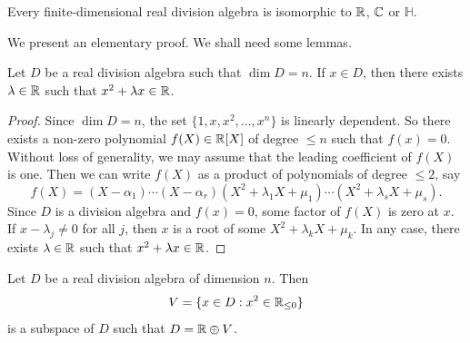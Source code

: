 \begin{theorem}[Frobenius]
	\label{thm:Frobenius}
	Every finite-dimensional real division algebra is isomorphic to $\mathbb{R}$, $\mathbb{C}$
	or $\mathbb{H}$.
\end{theorem}

We present an elementary proof. We shall need some lemmas. 

\begin{lemma}
	\label{lem:trick_frobenius1}
	Let $D$ be a real division algebra such that $\dim D=n$. If $x\in D$, then
	there exists $\lambda\in\mathbb{R}$ such that $x^2+\lambda x\in\mathbb{R}$.
\end{lemma}

\begin{proof}
	Since $\dim D=n$, the set $\{1,x,x^2,\dots,x^n\}$ is linearly dependent. So
	there exists a non-zero polynomial $f(X)\in\mathbb{R}[X]$ of degree $\leq n$ such
	that $f(x)=0$. Without loss of generality, we may assume that the leading
	coefficient of $f(X)$ is one. Then we can write $f(X)$ as a product of
	polynomials of degree $\leq2$, say 
	\[
		f(X)=(X-\alpha_1)\cdots (X-\alpha_r)(X^2+\lambda_1 X+\mu_1)\cdots (X^2+\lambda_s X+\mu_s).
	\]
	Since $D$ is a division algebra and $f(x)=0$, some factor of $f(X)$ is
	zero at $x$. If $x-\lambda_j\ne 0$ for all $j$, then $x$ is a root of some
	$X^2+\lambda_k X+\mu_k$. In any case, there exists $\lambda\in\mathbb{R}$ such that
	$x^2+\lambda x\in\mathbb{R}$. 
\end{proof}

\begin{lemma}
	\label{lem:trick_frobenius2}
	Let $D$ be a real division algebra of dimension $n$. Then
	\[
		V=\{x\in D:x^2\in\mathbb{R}_{\leq0}\}
	\]
	is a subspace of $D$ such that $D=\mathbb{R}\oplus V$.
\end{lemma}

